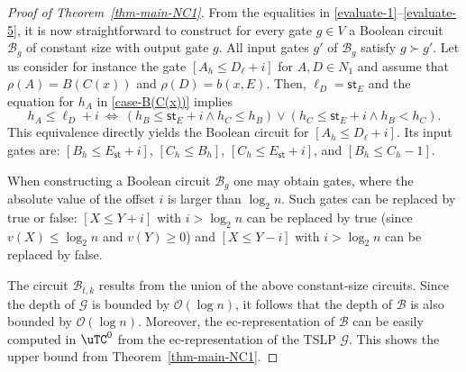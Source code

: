 \documentclass[a4paper,UKenglish,cleveref, autoref, thm-restate, numberwithinsect]{lipics-v2021}
\newcommand{\hs}{\mathsf{st}}
\begin{document}
\begin{proof}[Proof of Theorem~\ref{thm-main-NC1}]
From the equalities in \eqref{evaluate-1}--\eqref{evaluate-5}, it is now straightforward to construct for every gate $g \in V$ 
 a Boolean circuit $\mathcal{B}_g$ of constant size with output gate $g$. All input gates $g'$ of 
  $\mathcal{B}_g$ satisfy $g \succ g'$.
Let us consider for instance the gate $[A_h \leq D_\ell + i]$ for $A, D \in N_1$ and assume that $\rho(A) = B(C(x))$ and 
$\rho(D) = b(x,E)$. Then, $\ell_D = \hs_E$ and the equation for $h_A$ in \eqref{case-B(C(x))} implies
\[
h_A \leq \ell_D + i \  \Longleftrightarrow  \ (h_B \leq \hs_E + i \wedge h_C  \le h_B ) \vee  (h_C \leq \hs_E + i \wedge h_B < h_C).
\]
This equivalence directly yields the Boolean circuit for $[A_h \leq D_\ell + i]$. Its input gates are: 
$[B_h \leq E_\hs + i]$, $[C_h  \le B_h]$,  $[C_h \leq E_\hs + i]$, and $[B_h \le C_h-1]$. 

When constructing a Boolean circuit $\mathcal{B}_g$ one may obtain gates, where the absolute value of the offset $i$ is larger than $\log_2 n$.
Such gates can be replaced by \textsf{true} or \textsf{false}: $[X \leq Y + i]$ with $i > \log_2 n$ 
can be replaced by \textsf{true} (since $v(X) \leq \log_2 n $ and $v(Y) \geq 0$)
and $[X \leq Y - i]$ with $i > \log_2 n$  can be replaced by \textsf{false}.


The circuit $\mathcal{B}_{t,k}$ results from the union of the above constant-size circuits. 
Since the depth of $\mathcal{G}$ is bounded by $\mathcal{O}(\log n)$, it follows that the depth
of $\mathcal{B}$ is also bounded by $\mathcal{O}(\log n)$. Moreover, the ec-representation of $\mathcal{B}$ can 
be easily computed in $\uTC^0$ from the ec-representation of the TSLP $\mathcal{G}$. 
This shows the upper bound from Theorem~\ref{thm-main-NC1}.


\end{proof}
\end{document}
